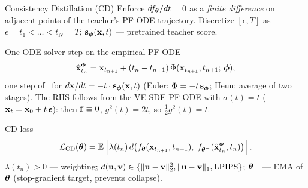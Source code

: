 \documentclass{beamer}
\renewcommand{\eqpause}{}
\begin{document}
\begin{frame}{Consistency Distillation (CD)}
	Enforce $df_{\boldsymbol{\theta}}/dt = 0$ as a \emph{finite difference} on adjacent points of the teacher's PF-ODE trajectory. Discretize $[\epsilon, T]$ as $\epsilon = t_1 < \dots < t_N = T$; $\mathbf{s}_{\boldsymbol{\phi}}(\mathbf{x}, t)$ --- pretrained teacher score.
	\eqpause
	\begin{block}{One ODE-solver step on the empirical PF-ODE}
		\vspace{-0.3cm}
		\[
			\hat{\mathbf{x}}_{t_n}^{\boldsymbol{\phi}} = \mathbf{x}_{t_{n+1}} + (t_n - t_{n+1})\, \Phi(\mathbf{x}_{t_{n+1}}, t_{n+1};\, \boldsymbol{\phi}),
		\]
		one step of \ODESolve\ for $d\mathbf{x}/dt = -t \cdot \mathbf{s}_{\boldsymbol{\phi}}(\mathbf{x}, t)$ (Euler: $\Phi = -t\, \mathbf{s}_{\boldsymbol{\phi}}$; Heun: average of two stages). The RHS follows from the VE-SDE PF-ODE with $\sigma(t) = t$ ($\mathbf{x}_t = \mathbf{x}_0 + t\,\boldsymbol{\epsilon}$): then $\mathbf{f} \equiv 0$, $g^2(t) = 2t$, so $\tfrac{1}{2} g^2(t) = t$.
	\end{block}
	\eqpause
	\begin{block}{CD loss}
		\vspace{-0.4cm}
		\[
			\mathcal{L}_{\text{CD}}(\boldsymbol{\theta}) = \mathbb{E} \left[\lambda(t_n)\, d\bigl(f_{\boldsymbol{\theta}}(\mathbf{x}_{t_{n+1}}, t_{n+1}),\; f_{\boldsymbol{\theta}^-}(\hat{\mathbf{x}}_{t_n}^{\boldsymbol{\phi}}, t_n)\bigr)\right].
		\]
		$\lambda(t_n) > 0$ --- weighting; $d(\mathbf{u}, \mathbf{v}) \in \{\|\mathbf{u} - \mathbf{v}\|_2^2, \|\mathbf{u} - \mathbf{v}\|_1, \text{LPIPS}\}$; $\boldsymbol{\theta}^-$ --- EMA of $\boldsymbol{\theta}$ (stop-gradient target, prevents collapse).
	\end{block}
\end{frame}
\end{document}
